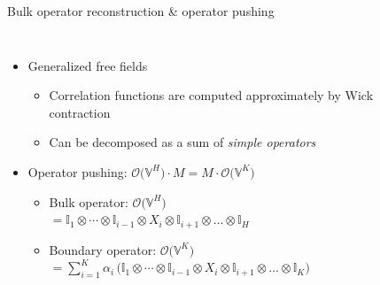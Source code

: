 \documentclass{fdubeamer}
\newcommand{\tikzinput}[1]{}
\newcommand{\1}{\mathbb{1}}
\newcommand{\I}{\mathbb{I}}
\begin{document}
\begin{frame}{Bulk operator reconstruction \& operator pushing}

\begin{columns}[c]


    \begin{itemize}
      \item Generalized free fields

        \begin{itemize}
          \item Correlation functions are computed approximately by Wick contraction
          \item Can be decomposed as a sum of \emph{simple operators}
        \end{itemize}

      \item Operator pushing: $\mathcal{O} \bigl( \mathbb{V}^H \bigr) \cdot M = M \cdot \mathcal{O} \bigl( \mathbb{V}^K \bigr)$
        \begin{itemize}
          \item Bulk operator: $\mathcal{O} \bigl( \mathbb{V}^H \bigr)$ \\
            \mbox{\quad}
            $
              = \I_1 \otimes \cdots \otimes \I_{i-1} \otimes X_i \otimes \I_{i+1} \otimes \dots \otimes \I_{H}
            $
          \item Boundary operator: $\mathcal{O} \bigl( \mathbb{V}^K \bigr)$ \\
            \mbox{\quad}
            $
              = \sum_{i=1}^K \alpha_i \, \bigl(
                  \I_1 \otimes \cdots \otimes \I_{i-1} \otimes X_i \otimes \I_{i+1} \otimes \dots \otimes \I_{K}
                \bigr)
            $
        \end{itemize}
    \end{itemize}


    \begin{center}
      \scriptsize
      \tikzset{x=1em, y=1em, node font=\tiny}
      \tikzinput{operator-pushing/operator-pushing-narrow}
    \end{center}

\end{columns}


\end{frame}
\end{document}
